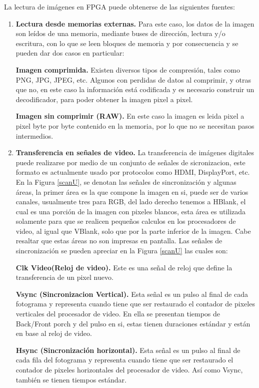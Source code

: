 \documentclass[twoside,spanish,ESP,MSc]{plantillaLabUPV}
\theoremstyle{definition}
\begin{document}
La lectura de imágenes en FPGA puede obtenerse de las siguientes fuentes:

\begin{enumerate}
 \item \textbf{Lectura desde memorias externas.}
 Para este caso, los datos de la imagen son leídos de una memoria, mediante buses de dirección, lectura y/o escritura, con lo que se leen bloques de memoria y por consecuencia  y se pueden dar dos casos en particular:
 
 \checkmark\textbf{Imagen comprimida.} Existen diversos tipos de compresión, tales como PNG, JPG, JPEG, etc. Algunos con perdidas de datos al comprimir, y otras  que no, en este caso la información está codificada y es necesario construir un decodificador, para poder obtener la imagen pixel a pixel. 
 
 \checkmark\textbf{Imagen sin comprimir (RAW).} En este caso la imagen es leida pixel a pixel byte por byte contenido en la memoria, por lo que no se necesitan pasos intermedios.
 
 
 \item \textbf{Transferencia en señales de video.} 
 La transferencia de imágenes digitales puede realizarse por medio de un conjunto de señales de sicronizacion, este formato es actualmente usado por protocolos como HDMI, DisplayPort, etc. En la Figura \ref{scanU}, se denotan las señales de sincronización y algunas áreas, la primer área es la que compone la imagen en si, puede ser de varios canales, usualmente tres para RGB, del lado derecho tenemos a HBlank, el cual es una porción de la imagen con pixeles blancos, esta área es utilizada solamente para que se realicen pequeños calculos en los procesadores de video, al igual que VBlank, solo que por la parte inferior de la imagen. Cabe resaltar que estas áreas no son impresas en pantalla. Las señales de sincronización se pueden apreciar en la Figura \ref{scanU} las cuales son: 
 
  \checkmark\textbf{Clk Video(Reloj de video).} Este es una señal de reloj que define la transferencia de un pixel nuevo.
 
 \checkmark\textbf{Vsync (Sincronizacion Vertical).} Esta señal es un pulso al final de cada fotograma y representa cuando tiene que ser restaurado el contador de pixeles verticales del procesador de video. En ella se presentan tiempos de Back/Front porch y del pulso en si, estas tienen duraciones estándar y están en base al reloj de video.
 
 \checkmark\textbf{Hsync (Sincronización horizontal).} Esta señal es un pulso al final de cada fila del fotograma y representa cuando tiene que ser restaurado el contador de pixeles horizontales del procesador de video. Así como Vsync, también se tienen tiempos estándar.
  

\end{enumerate}
\end{document}
